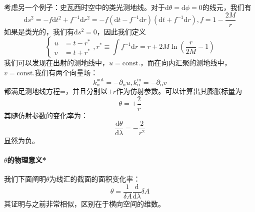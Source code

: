 \documentclass[hyperref, UTF8, a4paper]{ctexart}
\begin{document}
考虑另一个例子：史瓦西时空中的类光测地线。对于$\mathrm{d} \theta =\mathrm{d} \phi =0$的线元，我们有
\begin{equation*}
	\mathrm{d} s^{2} =-f\mathrm{d} t^{2} +f^{-1}\mathrm{d} r^{2} =-f(\mathrm{d} t-f^{-1}\mathrm{d} r)(\mathrm{d} t+f^{-1}\mathrm{d} r),f=1-\frac{2M}{r}
\end{equation*}
如果是类光的，我们有$\mathrm{d} s^{2} =0$，因此我们定义
\begin{equation*}
	\begin{cases}
		u & =t-r^{*}\\
		v & =t+r^{*}
	\end{cases} ,r^{*} \equiv \int f^{-1}\mathrm{d} r=r+2M\ln\left(\frac{r}{2M} -1\right)
\end{equation*}
我们可以发现在出射的测地线中，$u=\mathrm{const.}$，而在向内汇聚的测地线中，$v=\mathrm{const.}$我们有两个向量场：
\begin{equation*}
	k_{\alpha }^{\text{out}} =-\partial _{\alpha } u,k_{\alpha }^{\text{in}} =-\partial _{\alpha } v
\end{equation*}
都满足测地线方程=，并且分别以$\pm r$作为仿射参数。可以计算出其膨胀标量为
\begin{equation*}
	\theta =\pm \frac{2}{r}
\end{equation*}
其随仿射参数的变化率为：
\begin{equation*}
	\frac{\mathrm{d} \theta }{\mathrm{d} \lambda } =-\frac{2}{r^{2}}
\end{equation*}
显然为负。


\paragraph{$\theta $的物理意义*}

我们下面阐明$\theta $为线汇的截面的面积变化率：
\begin{equation*}
	\theta =\frac{1}{\delta A}\frac{\mathrm{d}}{\mathrm{d} \lambda } \delta A
\end{equation*}
其证明与之前非常相似，区别在于横向空间的维数。
\end{document}

